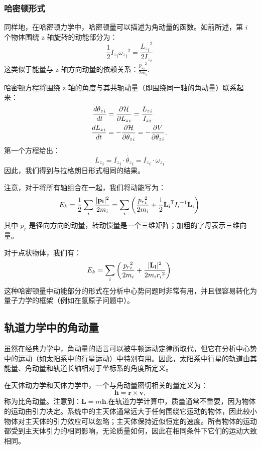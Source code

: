 \subsubsection{哈密顿形式}
同样地，在哈密顿力学中，哈密顿量可以描述为角动量的函数。如前所述，第 \(i\) 个物体围绕 z 轴旋转的动能部分为：
\[
\frac{1}{2}{I_{z}}_{i}{{\omega_{z}}_{i}}^{2} = \frac{{{L_{z}}_{i}}^{2}}{2{I_{z}}_{i}}~
\]
这类似于能量与 z 轴方向动量的依赖关系：\(\frac{{{p_{z}}_{i}}^{2}}{2m_{i}}\).

哈密顿方程将围绕 z 轴的角度与其共轭动量（即围绕同一轴的角动量）联系起来：
\[
\begin{aligned}
\frac{d{\theta_{z}}_{i}}{dt} &= \frac{\partial {\cal H}}{\partial {L_{z}}_{i}} = \frac{{L_{z}}_{i}}{{I_{z}}_{i}} \\
\frac{d{L_{z}}_{i}}{dt} &= -\frac{\partial {\cal H}}{\partial {\theta_{z}}_{i}} = -\frac{\partial V}{\partial {\theta_{z}}_{i}}.
\end{aligned}~
\]
第一个方程给出：
\[
{L_{z}}_{i} = {I_{z}}_{i} \cdot {\dot{\theta_{z}}_{i}} = {I_{z}}_{i} \cdot {\omega_{z}}_{i}~
\]
因此，我们得到与拉格朗日形式相同的结果。 

注意，对于将所有轴组合在一起，我们将动能写为：
\[
E_{k} = \frac{1}{2} \sum_{i} \frac{|{\bf{p}_{i}}|^{2}}{2m_{i}} = \sum_{i} \left( \frac{{p_{r}}_{i}^{2}}{2m_{i}} + \frac{1}{2} {\bf{L}_{i}}^{\textsf{T}} {I_{i}}^{-1} {\bf{L}_{i}} \right)~
\]
其中 \(p_{r}\) 是径向方向的动量，转动惯量是一个三维矩阵；加粗的字母表示三维向量。

对于点状物体，我们有：
\[
E_{k} = \sum_{i} \left( \frac{{p_{r}}_{i}^{2}}{2m_{i}} + \frac{|{\bf{L}_{i}}|^{2}}{2m_{i}{r_{i}}^{2}} \right)~
\]
这种哈密顿量中动能部分的形式在分析中心势问题时非常有用，并且很容易转化为量子力学的框架（例如在氢原子问题中）。 
\subsection{轨道力学中的角动量} 
虽然在经典力学中，角动量的语言可以被牛顿运动定律所取代，但它在分析中心势中的运动（如太阳系中的行星运动）中特别有用。因此，太阳系中行星的轨道由其能量、角动量和轨道长轴相对于坐标系的角度所定义。

在天体动力学和天体力学中，一个与角动量密切相关的量定义为：
\[
\mathbf{h} = \mathbf{r} \times \mathbf{v},
\]
称为比角动量。注意到：\(\mathbf{L} = m\mathbf{h}\).在轨道力学计算中，质量通常不重要，因为物体的运动由引力决定。系统中的主天体通常远大于任何围绕它运动的物体，因此较小物体对主天体的引力效应可以忽略；主天体保持近似恒定的速度。所有物体的运动都受到主天体引力的相同影响，无论质量如何，因此在相同条件下它们的运动大致相同。